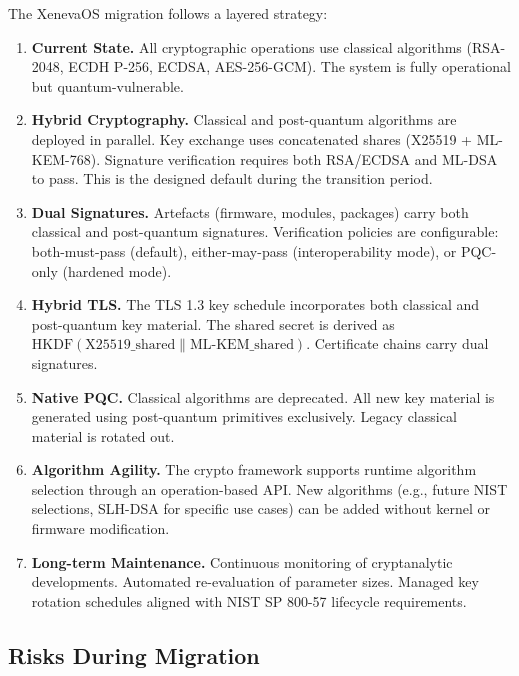 \documentclass[11pt, a4paper]{article}
\begin{document}
The XenevaOS migration follows a layered strategy:

\begin{enumerate}
    \item \textbf{Current State.} All cryptographic operations use classical algorithms (RSA-2048, ECDH P-256, ECDSA, AES-256-GCM). The system is fully operational but quantum-vulnerable.
    \item \textbf{Hybrid Cryptography.} Classical and post-quantum algorithms are deployed in parallel. Key exchange uses concatenated shares (X25519 + ML-KEM-768). Signature verification requires both RSA/ECDSA and ML-DSA to pass. This is the designed default during the transition period.
    \item \textbf{Dual Signatures.} Artefacts (firmware, modules, packages) carry both classical and post-quantum signatures. Verification policies are configurable: both-must-pass (default), either-may-pass (interoperability mode), or PQC-only (hardened mode).
    \item \textbf{Hybrid TLS.} The TLS 1.3 key schedule incorporates both classical and post-quantum key material. The shared secret is derived as $\text{HKDF}(\text{X25519\_shared} \| \text{ML-KEM\_shared})$. Certificate chains carry dual signatures.
    \item \textbf{Native PQC.} Classical algorithms are deprecated. All new key material is generated using post-quantum primitives exclusively. Legacy classical material is rotated out.
    \item \textbf{Algorithm Agility.} The crypto framework supports runtime algorithm selection through an operation-based API. New algorithms (e.g., future NIST selections, SLH-DSA for specific use cases) can be added without kernel or firmware modification.
    \item \textbf{Long-term Maintenance.} Continuous monitoring of cryptanalytic developments. Automated re-evaluation of parameter sizes. Managed key rotation schedules aligned with NIST SP 800-57 lifecycle requirements.
\end{enumerate}

\subsection{Risks During Migration}\label{sec:migration-risks}
\end{document}
